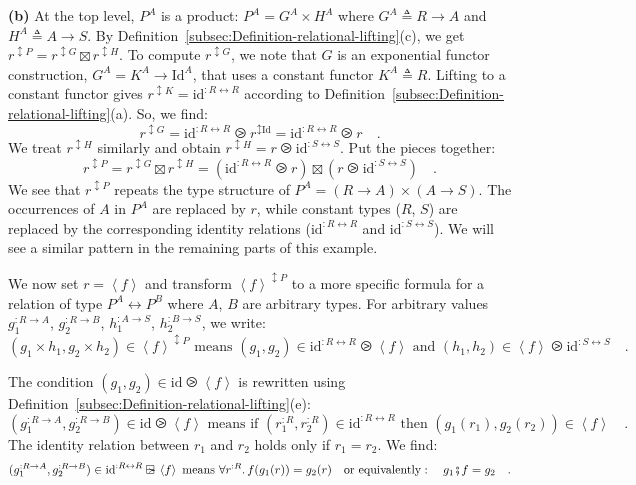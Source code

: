 \textbf{(b)} At the top level, $P^{A}$ is a product: $P^{A}=G^{A}\times H^{A}$
where $G^{A}\triangleq R\rightarrow A$ and $H^{A}\triangleq A\rightarrow S$.
By Definition~\ref{subsec:Definition-relational-lifting}(c), we
get $r^{\updownarrow P}=r^{\updownarrow G}\boxtimes r^{\updownarrow H}$.
To compute $r^{\updownarrow G}$, we note that $G$ is an exponential
functor construction, $G^{A}=K^{A}\rightarrow\text{Id}^{A}$, that
uses a constant functor $K^{A}\triangleq R$. Lifting to a constant
functor gives $r^{\updownarrow K}=\text{id}^{:R\leftrightarrow R}$
according to Definition~\ref{subsec:Definition-relational-lifting}(a).
So, we find:
\[
r^{\updownarrow G}=\text{id}^{:R\leftrightarrow R}\ogreaterthan r^{\updownarrow\text{Id}}=\text{id}^{:R\leftrightarrow R}\ogreaterthan r\quad.
\]
We treat $r^{\updownarrow H}$ similarly and obtain $r^{\updownarrow H}=r\ogreaterthan\text{id}^{:S\leftrightarrow S}$.
Put the pieces together:
\[
r^{\updownarrow P}=r^{\updownarrow G}\boxtimes r^{\updownarrow H}=(\text{id}^{:R\leftrightarrow R}\ogreaterthan r)\boxtimes(r\ogreaterthan\text{id}^{:S\leftrightarrow S})\quad.
\]
We see that $r^{\updownarrow P}$ repeats the type structure of $P^{A}=(R\rightarrow A)\times(A\rightarrow S)$.
The occurrences of $A$ in $P^{A}$ are replaced by $r$, while constant
types ($R$, $S$) are replaced by the corresponding identity relations
($\text{id}^{:R\leftrightarrow R}$ and $\text{id}^{:S\leftrightarrow S}$).
We will see a similar pattern in the remaining parts of this example.

We now set $r=\left<f\right>$ and transform $\left<f\right>^{\updownarrow P}$
to a more specific formula for a relation of type $P^{A}\leftrightarrow P^{B}$
where $A$, $B$ are arbitrary types. For arbitrary values $g_{1}^{:R\rightarrow A}$,
$g_{2}^{:R\rightarrow B}$, $h_{1}^{:A\rightarrow S}$, $h_{2}^{:B\rightarrow S}$,
we write:
\[
(g_{1}\times h_{1},g_{2}\times h_{2})\in\left<f\right>^{\updownarrow P}\text{ means }(g_{1},g_{2})\in\text{id}^{:R\leftrightarrow R}\ogreaterthan\left<f\right>\text{ and }(h_{1},h_{2})\in\left<f\right>\ogreaterthan\text{id}^{:S\leftrightarrow S}\quad.
\]

The condition $(g_{1},g_{2})\in\text{id}\ogreaterthan\left<f\right>$
is rewritten using Definition~\ref{subsec:Definition-relational-lifting}(e):
\[
(g_{1}^{:R\rightarrow A},g_{2}^{:R\rightarrow B})\in\text{id}\ogreaterthan\left<f\right>\text{ means if }(r_{1}^{:R},r_{2}^{:R})\in\text{id}^{:R\leftrightarrow R}\text{ then }(g_{1}(r_{1}),g_{2}(r_{2}))\in\left<f\right>\quad.
\]
The identity relation between $r_{1}$ and $r_{2}$ holds only if
$r_{1}=r_{2}$. We find:
\[
(g_{1}^{:R\rightarrow A},g_{2}^{:R\rightarrow B})\in\text{id}^{:R\leftrightarrow R}\ogreaterthan\left<f\right>\text{ means }\forall r^{:R}.\,f(g_{1}(r))=g_{2}(r)\quad\text{or equivalently}:\quad g_{1}\bef f=g_{2}\quad.
\]

